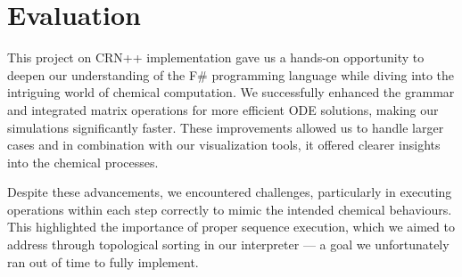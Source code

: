\section{Evaluation}

This project on CRN++ implementation gave us a hands-on opportunity to deepen our understanding of the F\# programming language while diving into the intriguing world of chemical computation. We successfully enhanced the grammar and integrated matrix operations for more efficient ODE solutions, making our simulations significantly faster. These improvements allowed us to handle larger cases and in combination with our visualization tools, it offered clearer insights into the chemical processes.

Despite these advancements, we encountered challenges, particularly in executing operations within each step correctly to mimic the intended chemical behaviours. This highlighted the importance of proper sequence execution, which we aimed to address through topological sorting in our interpreter — a goal we unfortunately ran out of time to fully implement. 
